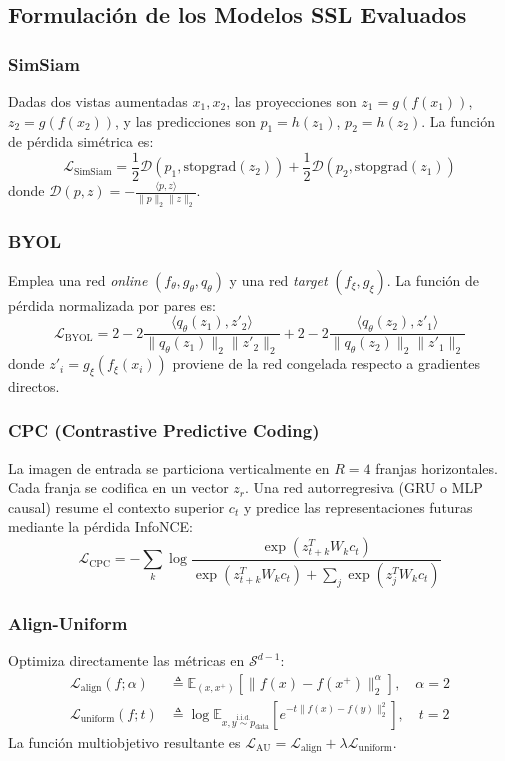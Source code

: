 \subsection{Formulación de los Modelos SSL Evaluados}

\subsubsection{SimSiam}
Dadas dos vistas aumentadas $x_1, x_2$, las proyecciones son $z_1 = g(f(x_1))$, $z_2 = g(f(x_2))$, y las predicciones son $p_1 = h(z_1)$, $p_2 = h(z_2)$. La función de pérdida simétrica es:
\begin{equation}
\mathcal{L}_{\text{SimSiam}} = \frac{1}{2} \mathcal{D}(p_1, \text{stopgrad}(z_2)) + \frac{1}{2} \mathcal{D}(p_2, \text{stopgrad}(z_1))
\end{equation}
donde $\mathcal{D}(p, z) = -\frac{\langle p, z \rangle}{\|p\|_2 \|z\|_2}$.

\subsubsection{BYOL}
Emplea una red \textit{online} $(f_\theta, g_\theta, q_\theta)$ y una red \textit{target} $(f_\xi, g_\xi)$. La función de pérdida normalizada por pares es:
\begin{equation}
\mathcal{L}_{\text{BYOL}} = 2 - 2 \frac{\langle q_\theta(z_1), z'_2 \rangle}{\|q_\theta(z_1)\|_2 \|z'_2\|_2} + 2 - 2 \frac{\langle q_\theta(z_2), z'_1 \rangle}{\|q_\theta(z_2)\|_2 \|z'_1\|_2}
\end{equation}
donde $z'_i = g_\xi(f_\xi(x_i))$ proviene de la red congelada respecto a gradientes directos.

\subsubsection{CPC (Contrastive Predictive Coding)}
La imagen de entrada se particiona verticalmente en $R = 4$ franjas horizontales. Cada franja se codifica en un vector $z_r$. Una red autorregresiva (GRU o MLP causal) resume el contexto superior $c_t$ y predice las representaciones futuras mediante la pérdida InfoNCE:
\begin{equation}
\mathcal{L}_{\text{CPC}} = -\sum_{k} \log \frac{\exp(z_{t+k}^T W_k c_t)}{\exp(z_{t+k}^T W_k c_t) + \sum_{j} \exp(z_j^T W_k c_t)}
\end{equation}

\subsubsection{Align-Uniform}
Optimiza directamente las métricas en $\mathcal{S}^{d-1}$:
\begin{align}
\mathcal{L}_{\text{align}}(f; \alpha) &\triangleq \mathbb{E}_{(x, x^+)} \left[ \|f(x) - f(x^+)\|_2^\alpha \right], \quad \alpha = 2 \\
\mathcal{L}_{\text{uniform}}(f; t) &\triangleq \log \mathbb{E}_{x, y \overset{\text{i.i.d.}}{\sim} p_{\text{data}}} \left[ e^{-t \|f(x) - f(y)\|_2^2} \right], \quad t = 2
\end{align}
La función multiobjetivo resultante es $\mathcal{L}_{\text{AU}} = \mathcal{L}_{\text{align}} + \lambda \mathcal{L}_{\text{uniform}}$.
